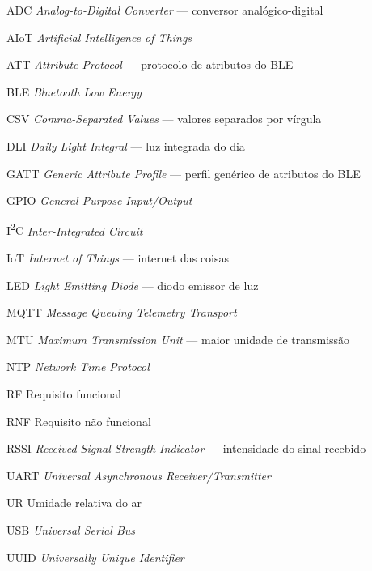 
\begin{siglas}
  \item[ADC] \emph{Analog-to-Digital Converter} --- conversor analógico-digital
  \item[AIoT] \emph{Artificial Intelligence of Things}
  \item[ATT] \emph{Attribute Protocol} --- protocolo de atributos do BLE
  \item[BLE] \emph{Bluetooth Low Energy}
  \item[CSV] \emph{Comma-Separated Values} --- valores separados por vírgula
  \item[DLI] \emph{Daily Light Integral} --- luz integrada do dia
  \item[GATT] \emph{Generic Attribute Profile} --- perfil genérico de atributos do BLE
  \item[GPIO] \emph{General Purpose Input/Output}
  \item[I\textsuperscript{2}C] \emph{Inter-Integrated Circuit}
  \item[IoT] \emph{Internet of Things} --- internet das coisas
  \item[LED] \emph{Light Emitting Diode} --- diodo emissor de luz
  \item[MQTT] \emph{Message Queuing Telemetry Transport}
  \item[MTU] \emph{Maximum Transmission Unit} --- maior unidade de transmissão
  \item[NTP] \emph{Network Time Protocol}
  \item[RF] Requisito funcional
  \item[RNF] Requisito não funcional
  \item[RSSI] \emph{Received Signal Strength Indicator} --- intensidade do sinal recebido
  \item[UART] \emph{Universal Asynchronous Receiver/Transmitter}
  \item[UR] Umidade relativa do ar
  \item[USB] \emph{Universal Serial Bus}
  \item[UUID] \emph{Universally Unique Identifier}
\end{siglas}
